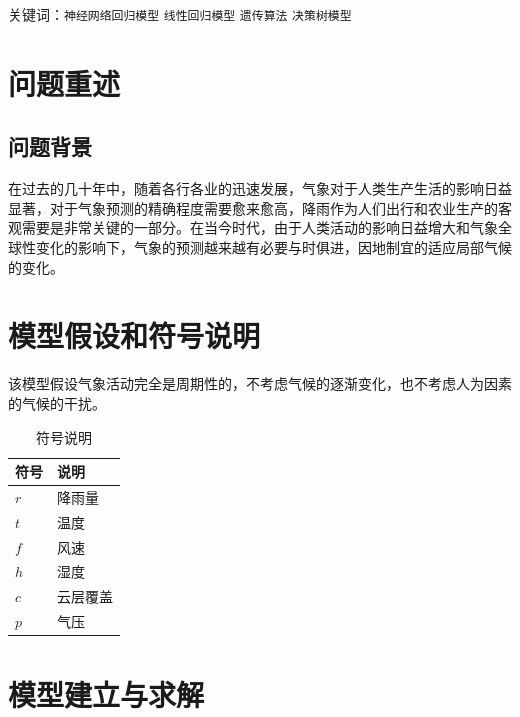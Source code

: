 \documentclass[UTF8, a4paper]{ctexart}
\begin{document}
关键词：\texttt{神经网络回归模型}  \texttt{线性回归模型}  \texttt{遗传算法} \texttt{决策树模型}

\newpage

\section{问题重述}

\subsection{问题背景}

在过去的几十年中，随着各行各业的迅速发展，气象对于人类生产生活的影响日益显著，对于气象预测的精确程度需要愈来愈高，降雨作为人们出行和农业生产的客观需要是非常关键的一部分。在当今时代，由于人类活动的影响日益增大和气象全球性变化的影响下，气象的预测越来越有必要与时俱进，因地制宜的适应局部气候的变化。


\section{模型假设和符号说明}

该模型假设气象活动完全是周期性的，不考虑气候的逐渐变化，也不考虑人为因素的气候的干扰。

\begin{table}[h]
	\centering
	\caption{符号说明}
	\begin{tabular}{p{6em}l}
		\hline
		符号  & 说明     \\
		\hline
		$r$ & 降雨量    \\
		$t$ & 温度 \\
		$f$ & 风速\\
		$h$ & 湿度\\
		$c$ & 云层覆盖\\
		$p$ & 气压\\
		\hline
	\end{tabular}
\end{table}

\section{模型建立与求解}
\end{document}
